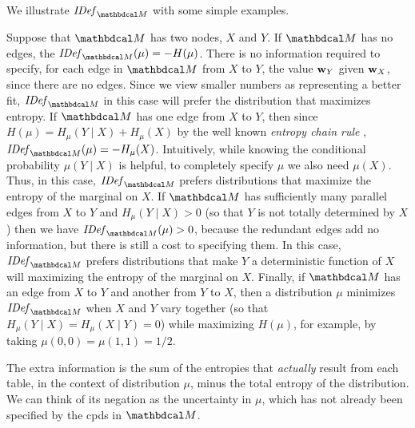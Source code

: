 \documentclass{article}
\newcommand{\dg}[1]{\mathbdcal #1}
\newcommand{\IDef}[1]{\mathit{IDef}_{#1}}
\begin{document}
We illustrate $\IDef{\dg M}$ with some simple examples.  
\begin{example}
Suppose that $\dg M$ has two nodes, $X$ and $Y$.  
If $\dg M$ has no edges, the $\IDef{\dg M}(\mu) = - H(\mu)$.
There is no information required to specify, for each edge in ${\dg
	M}$ from $X$ to
$Y$, the value ${\mathbf w}_Y$ given ${\mathbf w}_X$, since there are no
edges.
Since we view smaller numbers as representing a better fit,
$\IDef{\dg M}$ in this case will prefer the distribution that
maximizes entropy.
If $\dg M$ has one edge from $X$ to $Y$, then since
$H(\mu) = H_{\mu}(Y \mid X) + H_\mu(X)$ by the well known 
\emph{entropy chain rule} \cite{mackay2003information},
$\IDef{\dg   M}(\mu) = -H_{\mu}(X)$.
Intuitively, while knowing the conditional probability $\mu(Y \mid X)$
is helpful, to completely specify $\mu$ we also need 
$\mu(X)$.     Thus, in this case, $\IDef{\dg
	M}$ prefers distributions that maximize the entropy of 
the marginal on $X$.
If $\dg M$ has  
sufficiently many parallel edges
from $X$ to $Y$
and $H_{\mu}(Y \mid X) > 0$ 
(so that $Y$ is not totally determined by $X$)
then we have $\IDef{\dg M}(\mu) > 0$, because the redundant edges add no
information, but there is still a cost to specifying them.
In this case, $\IDef{\dg M}$ prefers distributions that make $Y$ a
deterministic function of $X$ will maximizing the entropy of the
marginal on $X$.
Finally, if ${\dg M}$ has an edge from $X$ to $Y$ and another from $Y$
to $X$, then 
a distribution $\mu$ minimizes
$\IDef{\dg M}$ when 
$X$ and $Y$  vary together
(so that $H_\mu(Y \mid X) = H_\mu(X \mid Y) = 0$) while
maximizing $H(\mu)$, for example, by taking $\mu(0,0) = \mu(1,1) = 1/2$.
\end{example}

	
	The extra information is the sum of the entropies that
	\emph{actually} result from each table, in the context of
	distribution $\mu$, minus the total entropy of the
	distribution. 
	We can think of
	its negation
	as the uncertainty in $\mu$,
	which has not already been specified by the cpds in $\dg M$.
	
\end{document}
